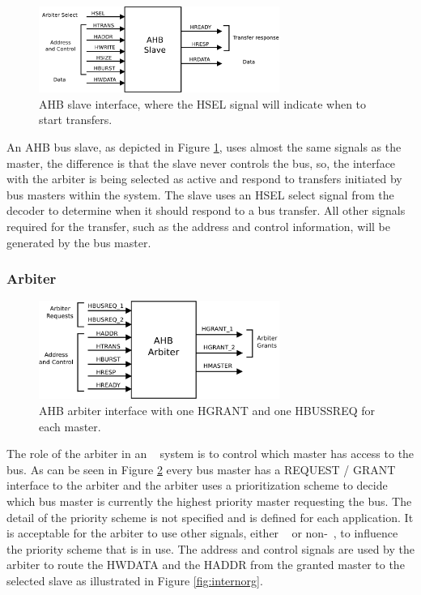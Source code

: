 \begin{figure}[!ht]
    \centering
    \includegraphics[width=0.7\textwidth]{figures/pdf/ahb_slave_new.pdf}
    \caption{AHB slave interface, where the HSEL signal will indicate when to start transfers.}
    \label{fig:slaveint}
\end{figure}
An AHB bus slave, as depicted in Figure \ref{fig:slaveint}, uses almost the same signals as the master, the difference is that the slave never controls the bus, so,  the interface with the arbiter is being selected as active and respond to transfers initiated by bus masters within the system. The slave uses an HSEL select signal from the decoder to determine when it should respond to a bus transfer. All other signals required for the transfer, such as the address and control information, will be generated by the bus master.
 
\subsubsection{Arbiter}
\begin{figure}[ht]
    \centering
    \includegraphics[width=0.7\textwidth]{figures/pdf/ahb_arbiter_new.pdf}
    \caption{AHB arbiter interface with one HGRANT and one HBUSSREQ for each master.}
    \label{fig:arbiterint}
\end{figure}

 The role of the arbiter in an \amba~ system is to control which master has access to the bus. As can be seen in Figure \ref{fig:arbiterint} every bus master has a REQUEST / GRANT interface to the arbiter and the arbiter uses a prioritization scheme to decide which bus master is currently the highest priority master requesting the bus. The detail of the priority scheme is not specified and is defined for each application. It is acceptable for the arbiter to use other signals, either \amba~ or non-\amba~, to influence the priority scheme that is in use.
 The address and control signals are used by the arbiter to route the HWDATA and the HADDR from the granted master to the selected slave as illustrated in Figure     \ref{fig:internorg}.
 
